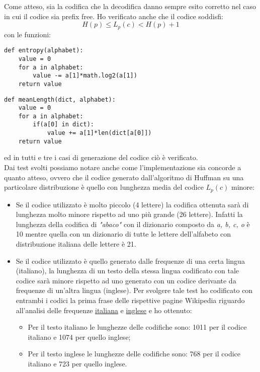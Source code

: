 \documentclass{article}
\begin{document}
Come atteso, sia la codifica che la decodifica danno sempre esito corretto nel caso in cui il codice sia prefix free. Ho verificato anche che il codice soddisfi:
\begin{equation}
    H(p) \leq L_p(c) < H(p)+1
\end{equation}
con le funzioni:
\begin{lstlisting}
def entropy(alphabet):
    value = 0
    for a in alphabet:
        value -= a[1]*math.log2(a[1])
    return value
\end{lstlisting}
\begin{lstlisting}
def meanLength(dict, alphabet):
    value = 0
    for a in alphabet:
        if(a[0] in dict):
            value += a[1]*len(dict[a[0]])
    return value
\end{lstlisting}
ed in tutti e tre i casi di generazione del codice ciò è verificato.
\\
Dai test svolti possiamo notare anche come l'implementazione sia concorde a quanto atteso, ovvero che il codice generato dall'algoritmo di Huffman su una particolare distribuzione è quello con lunghezza media del codice $L_p(c)$ minore:
\begin{itemize}
    \item Se il codice utilizzato è molto piccolo (4 lettere) la codifica ottenuta sarà di lunghezza molto minore rispetto ad uno più grande (26 lettere). Infatti la lunghezza della codifica di \textit{"abaco"} con il dizionario composto da \textit{a, b, c, o} è 10 mentre quella con un dizionario di tutte le lettere dell'alfabeto con distribuzione italiana delle lettere è 21.
    \item Se il codice utilizzato è quello generato dalle frequenze di una certa lingua (italiano), la lunghezza di un testo della stessa lingua codificato con tale codice sarà minore rispetto ad uno generato con un codice derivante da frequenze di un'altra lingua (inglese). Per svolgere tale test ho codificato con entrambi i codici la prima frase delle rispettive pagine Wikipedia riguardo all'analisi delle frequenze \href{https://it.wikipedia.org/wiki/Analisi_delle_frequenze}{italiana} e \href{https://en.wikipedia.org/wiki/Frequency_analysis}{inglese} e ho ottenuto:
    \begin{itemize}
        \item Per il testo italiano le lunghezze delle codifiche sono: 1011 per il codice italiano e 1074 per quello inglese;
        \item Per il testo inglese le lunghezze delle codifiche sono: 768 per il codice italiano e 723 per quello inglese.
    \end{itemize}
\end{itemize}
\end{document}
